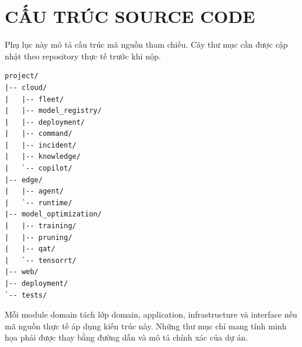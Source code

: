 \chapter{CẤU TRÚC SOURCE CODE}

Phụ lục này mô tả cấu trúc mã nguồn tham chiếu. Cây thư mục cần được cập nhật
theo repository thực tế trước khi nộp.

\begin{lstlisting}[caption={Cấu trúc mã nguồn tổng quát}]
project/
|-- cloud/
|   |-- fleet/
|   |-- model_registry/
|   |-- deployment/
|   |-- command/
|   |-- incident/
|   |-- knowledge/
|   `-- copilot/
|-- edge/
|   |-- agent/
|   `-- runtime/
|-- model_optimization/
|   |-- training/
|   |-- pruning/
|   |-- qat/
|   `-- tensorrt/
|-- web/
|-- deployment/
`-- tests/
\end{lstlisting}

Mỗi module domain tách lớp domain, application, infrastructure và interface nếu
mã nguồn thực tế áp dụng kiến trúc này. Những thư mục chỉ mang tính minh họa phải
được thay bằng đường dẫn và mô tả chính xác của dự án.